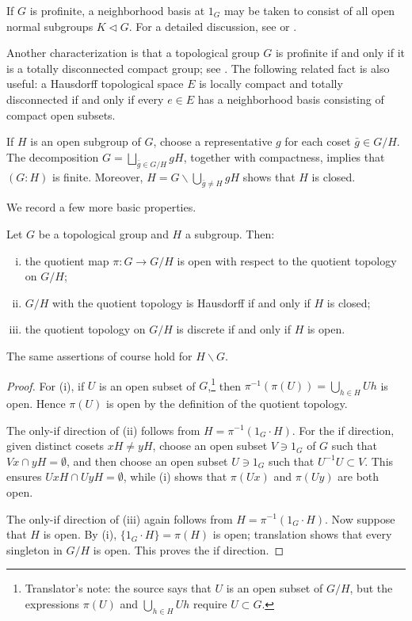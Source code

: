 If $G$ is profinite, a neighborhood basis at $1_G$ may be taken to consist of all open normal subgroups $K\lhd G$. For a detailed discussion, see \cite[\S 1.9]{FL14} or \cite[\S 4.10]{Li1}.

\begin{remark}
	Another characterization is that a topological group $G$ is profinite if and only if it is a totally disconnected compact group; see \cite[\S 1.7 and Proposition 1.9.3]{FL14}. The following related fact is also useful: a Hausdorff topological space $E$ is locally compact and totally disconnected if and only if every $e\in E$ has a neighborhood basis consisting of compact open subsets.
\end{remark}

If $H$ is an open subgroup of $G$, choose a representative $g$ for each coset $\bar g\in G/H$. The decomposition
$G=\bigsqcup_{\bar g\in G/H}gH$, together with compactness, implies that $(G:H)$ is finite. Moreover,
$H=G\smallsetminus\bigcup_{\bar g\neq H}gH$ shows that $H$ is closed.

We record a few more basic properties.

\begin{lemma}
	Let $G$ be a topological group and $H$ a subgroup. Then:
	\begin{enumerate}[(i)]
		\item the quotient map $\pi:G\to G/H$ is open with respect to the quotient topology on $G/H$;
		\item $G/H$ with the quotient topology is Hausdorff if and only if $H$ is closed;
		\item the quotient topology on $G/H$ is discrete if and only if $H$ is open.
	\end{enumerate}
	The same assertions of course hold for $H\backslash G$.
\end{lemma}
\begin{proof}
	For (i), if $U$ is an open subset of $G$,\footnote{Translator's note: the source says that $U$ is an open subset of $G/H$, but the expressions $\pi(U)$ and $\bigcup_{h\in H}Uh$ require $U\subset G$.} then
	$\pi^{-1}(\pi(U))=\bigcup_{h\in H}Uh$ is open. Hence $\pi(U)$ is open by the definition of the quotient topology.

	The only-if direction of (ii) follows from $H=\pi^{-1}(1_G\cdot H)$. For the if direction, given distinct cosets $xH\neq yH$, choose an open subset $V\ni1_G$ of $G$ such that $Vx\cap yH=\emptyset$, and then choose an open subset $U\ni1_G$ such that $U^{-1}U\subset V$. This ensures $UxH\cap UyH=\emptyset$, while (i) shows that $\pi(Ux)$ and $\pi(Uy)$ are both open.

	The only-if direction of (iii) again follows from $H=\pi^{-1}(1_G\cdot H)$. Now suppose that $H$ is open. By (i), $\{1_G\cdot H\}=\pi(H)$ is open; translation shows that every singleton in $G/H$ is open. This proves the if direction.
\end{proof}

